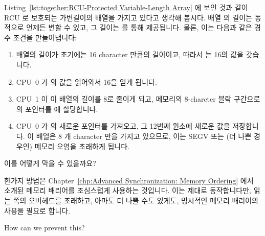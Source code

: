 Listing~\ref{lst:together:RCU-Protected Variable-Length Array} 에 보인 것과 같이
RCU 로 보호되는 가변길이의 배열을 가지고 있다고 생각해 봅시다.
배열  의 길이는 동적으로 언제든 변할 수 있고, 그 길이는 
를 통해 제공됩니다.
물론, 이는 다음과 같은 경주 조건을 만들어냅니다:
\iffalse

Suppose we have an RCU-protected variable-length array, as shown in
Listing~\ref{lst:together:RCU-Protected Variable-Length Array}.
The length of the array \co{->a[]} can change dynamically, and at any
given time, its length is given by the field \co{->length}.
Of course, this introduces the following race condition:
\fi

\begin{enumerate}
\item	배열의 길이가 초기에는 16 character 만큼의 길이이고, 따라서
	 는 16의 값을 갖습니다.
\item	CPU~0 가  의 값을 읽어와서 16을 얻게 됩니다.
\item	CPU~1 이 이 배열의 길이를 8로 줄이게 되고, 메모리의 8-charcter 블락
	구간으로의 포인터를  에 할당합니다.
\item	CPU~0 가  의 새로운 포인터를 가져오고, 그 12번째 원소에
	새로운 값을 저장합니다.
	이 배열은 8 개 character 만을 가지고 있으므로, 이는 SEGV 또는 (더 나쁜
	경우인) 메모리 오염을 초래하게 됩니다.
\iffalse

\item	The array is initially 16 characters long, and thus \co{->length}
	is equal to 16.
\item	CPU~0 loads the value of \co{->length}, obtaining the value 16.
\item	CPU~1 shrinks the array to be of length 8, and assigns a pointer
	to a new 8-character block of memory into \co{->a[]}.
\item	CPU~0 picks up the new pointer from \co{->a[]}, and stores a
	new value into element 12.
	Because the array has only 8 characters, this results in
	a SEGV or (worse yet) memory corruption.
\fi
\end{enumerate}

이를 어떻게 막을 수 있을까요?

한가지 방법은
Chapter~\ref{chp:Advanced Synchronization: Memory Ordering} 에서 소개된 메모리 배리어를
조심스럽게 사용하는 것입니다.
이는 제대로 동작합니다만, 읽는 쪽의 오버헤드를 초래하고, 아마도 더 나쁠 수도
있게도, 명시적인 메모리 배리어의 사용을 필요로 합니다.
\iffalse

How can we prevent this?

